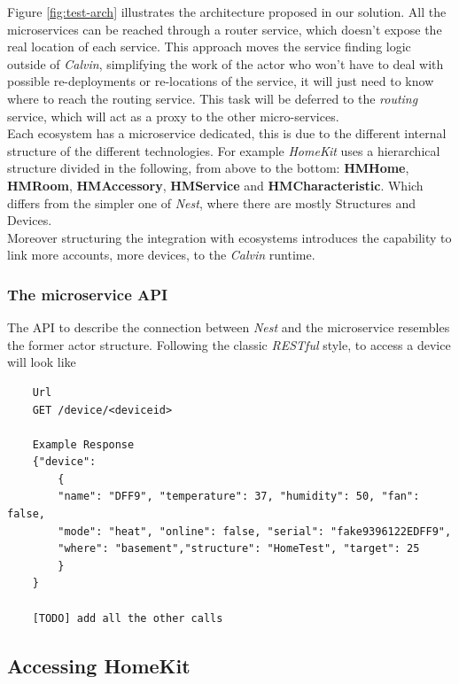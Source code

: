 Figure \ref{fig:test-arch} illustrates the architecture proposed in our solution.
All the microservices can be reached through a router service, which doesn't expose
the real location of each service. This approach moves the service finding logic outside
of \textit{Calvin}, simplifying the work of the actor who won't have to deal with possible
re-deployments or re-locations of the service, it will just need to know where to reach the
routing service. This task will be deferred to the \textit{routing} service, which will act
as a proxy to the other micro-services.\\
Each ecosystem has a microservice dedicated, this is due to the different internal structure of the
different technologies. For example \textit{HomeKit} uses a hierarchical structure divided in the following,
from above to the bottom: \textbf{HMHome}, \textbf{HMRoom}, \textbf{HMAccessory}, \textbf{HMService} and \textbf{HMCharacteristic}.
Which differs from the simpler one of \textit{Nest}, where there are mostly Structures and Devices.\\
Moreover structuring the integration with ecosystems introduces the capability to link more accounts, more devices,
to the \textit{Calvin} runtime.

\subsubsection{The microservice API}

The API to describe the connection between \textit{Nest} and the microservice
resembles the former actor structure.
Following the classic \textit{RESTful} style, to access a device will look like
\begin{verbatim}
    Url
    GET /device/<deviceid>

    Example Response
    {"device":
        {
        "name": "DFF9", "temperature": 37, "humidity": 50, "fan": false,
        "mode": "heat", "online": false, "serial": "fake9396122EDFF9",
        "where": "basement","structure": "HomeTest", "target": 25
        }
    }

    [TODO] add all the other calls
\end{verbatim}




\pagebreak
\subsection{Accessing HomeKit}

